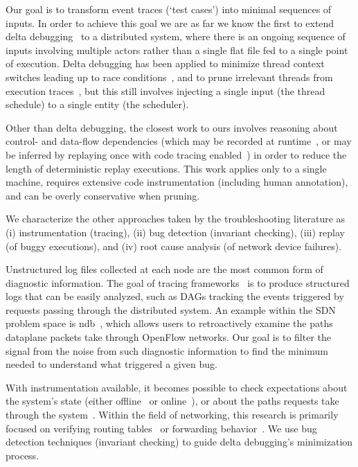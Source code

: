 Our goal is to transform
event traces (`test cases') into minimal sequences of inputs.
In order to achieve this goal we are as far we know the first to
extend delta debugging~\cite{Zeller:1999:YMP:318773.318946,Zeller:2002:SIF:506201.506206}
to a distributed system, where there is an ongoing sequence of inputs
involving multiple actors rather than a single flat file fed to a single point of
execution. Delta debugging has been applied to minimize thread context switches
leading up to race conditions~\cite{choi2002isolating}, and to
prune irrelevant threads from execution traces~\cite{huang2012lean}, but this still
involves injecting a single input (the thread schedule) to a single entity (the
scheduler).

Other than delta debugging, the closest work to ours involves reasoning about
control- and data-flow dependencies
(which may be recorded at runtime~\cite{Lee:2011:TGR:1993498.1993528}, or
may be inferred by replaying once with code tracing enabled~\cite{tallam2007enabling})
in order to reduce the
length of deterministic replay executions. This work applies only to a single
machine, requires extensive code
instrumentation (including human annotation), and can be overly conservative when
pruning.

We characterize the other approaches taken by the troubleshooting literature
as (i) instrumentation (tracing),
(ii) bug detection (invariant checking),
(iii) replay (of buggy executions), and
(iv) root cause analysis (of network device failures).

\vspace{0.05in}
 Unstructured
log files collected at each node are the most common form of diagnostic information. The goal of
tracing
frameworks~\cite{pip,fonseca2007x,Chen02pinpoint:problem,ndb14,barham2004using}
is to produce structured logs that can be easily analyzed, such as DAGs tracking the events triggered by
requests passing through the distributed system. An example within the SDN
problem space is ndb~\cite{ndb14}, which
allows users to retroactively examine the paths dataplane packets
take through OpenFlow networks. Our goal is to filter the signal from the
noise from such diagnostic information to find the minimum needed
to understand what triggered a given bug.

\vspace{0.05in}
 With instrumentation available, it becomes possible
to check expectations about the
system's state (either offline~\cite{Liu07widschecker} or online~\cite{d3s,dao2009live}), or about the paths requests take through
the system~\cite{pip}. Within the field of networking, this research is
primarily focused on verifying routing tables~\cite{hsa,hsa_realtime,anteater,khurshid2012veriflow}
or forwarding behavior~\cite{Zeng:2012:ATP:2413176.2413205,libra}.
We use bug detection techniques (invariant checking) to guide delta debugging's minimization
process.


